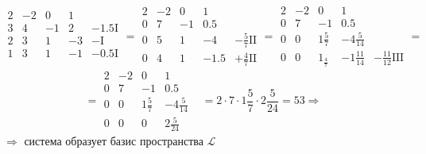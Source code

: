 \documentclass{article}
\begin{document}
\begin{center}
  $$
    \begin{array}{|cccc|c}
      2 & -2 & 0  & 1  &                \\
      3 & 4  & -1 & 2  & -1.5\mathrm{I} \\
      2 & 3  & 1  & -3 & -\mathrm{I}    \\
      1 & 3  & 1  & -1 & -0.5\mathrm{I} \\
    \end{array}=
    \begin{array}{|cccc|c}
      2 & -2 & 0  & 1    &                         \\
      0 & 7  & -1 & 0.5  &                         \\
      0 & 5  & 1  & -4   & -\frac{5}{7}\mathrm{II} \\
      0 & 4  & 1  & -1.5 & +\frac{4}{7}\mathrm{II}
    \end{array}=
    \begin{array}{|cccc|c}
      2 & -2 & 0               & 1                &                            \\
      0 & 7  & -1              & 0.5              &                            \\
      0 & 0  & 1 \frac{5}{7}   & -4 \frac{5}{14}  &                            \\
      0 & 0  & 1_{\frac{4}{7}} & -1 \frac{11}{14} & -\frac{11}{12}\mathrm{III}
    \end{array}=
  $$$$
    =\begin{array}{|cccc|c}
      2 & -2 & 0             & 1               & \\
      0 & 7  & -1            & 0.5             & \\
      0 & 0  & 1 \frac{5}{7} & -4 \frac{5}{14} & \\
      0 & 0  & 0             & 2 \frac{5}{24}  &
    \end{array}=2 \cdot 7 \cdot 1 \frac{5}{7} \cdot 2 \frac{5}{24}=53 \Rightarrow $$
  $\Rightarrow$ система образует базис пространства $\mathcal{L}$
\end{center}
\end{document}
